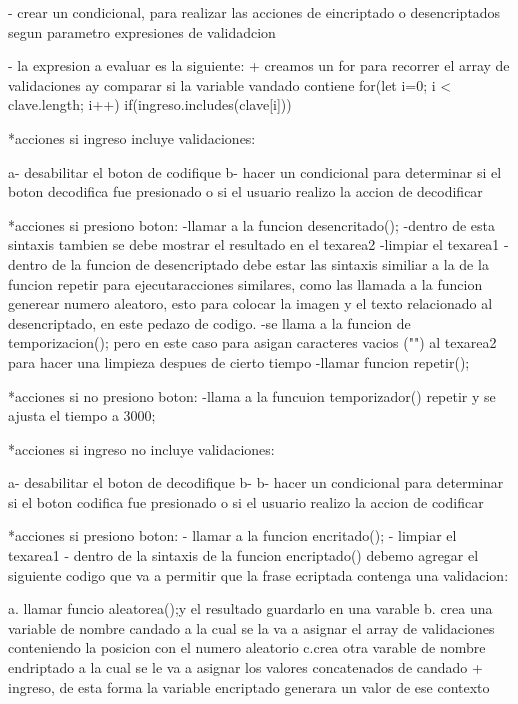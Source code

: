         - crear un condicional, para realizar las acciones de eincriptado o desencriptados segun parametro expresiones de validadcion

        - la expresion a evaluar es la siguiente:
            + creamos un for para recorrer el array de validaciones ay comparar si la variable vandado contiene 
           for(let i=0; i < clave.length; i++){
              if(ingreso.includes(clave[i])){ 
              }        
          }

          *acciones si ingreso incluye validaciones:
             
              a- desabilitar el boton de codifique
              b- hacer un condicional para determinar si el boton decodifica fue presionado o si el usuario realizo la accion de decodificar 

              *acciones si presiono boton:
                 -llamar a la funcion desencritado();
                 -dentro de esta sintaxis tambien se debe mostrar el resultado en el texarea2
                 -limpiar el texarea1
                 -dentro de la funcion de desencriptado debe estar las sintaxis similiar a la de la funcion repetir para ejecutaracciones similares, como las llamada a la funcion generear numero aleatoro, esto para colocar la imagen y el texto relacionado al desencriptado, en este pedazo de codigo.
                 -se llama a la  funcion de temporizacion(); pero en este caso para asigan caracteres vacios ("") al texarea2 para hacer una limpieza despues de cierto tiempo
                 -llamar funcion repetir();
              
              *acciones si no presiono boton:
                -llama a la funcuion temporizador() repetir y se ajusta el tiempo a 3000;
          
         *acciones si ingreso no incluye validaciones:

              a- desabilitar el boton de decodifique
              b- b- hacer un condicional para determinar si el boton codifica fue presionado o si el usuario realizo la accion de codificar 

              *acciones si presiono boton:
                  - llamar a la funcion encritado();
                  - limpiar el texarea1
                  - dentro de la sintaxis de la funcion encriptado() debemo agregar el siguiente codigo que va a permitir que la frase ecriptada contenga una validacion:

                      a. llamar funcio aleatorea();y el resultado guardarlo en una varable
                      b. crea una variable de nombre candado a la cual se la va a asignar el array de validaciones conteniendo la posicion con el numero aleatorio
                      c.crea otra varable de nombre endriptado a la cual se le va a asignar los valores concatenados de candado + ingreso, de esta forma la variable encriptado generara un valor de ese contexto

